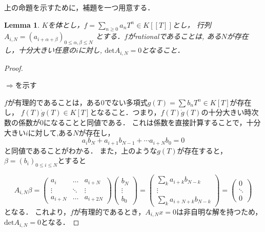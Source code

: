 \documentclass{ujarticle}
\newtheorem{lem}[thm]{Lemma}
\begin{document}
上の命題を示すために，補題を一つ用意する．
\begin{lem}
$K$を体とし，$f　= \sum_{ n \ge 0 }a_nT^n　\in K[[T]]$とし，
行列$A_{i,N}=(a_{i + \alpha + \beta})_{0 \le \alpha,\beta \le N}$
とする．$f$がrationalであることは,
ある$N$が存在し，十分大きい任意の$i$に対し,
$\mathrm{det}A_{i,N}=0$となること．
\end{lem}

\begin{proof}

  \begin{description}
    \item[$\Rightarrow$を示す]
  \end{description}
  $f$が有理的であることは，ある0でない多項式$g(T) = \sum b_n T^n \in K[T]$が存在し，
  $f(T) \dot g(T) \in K[T]$となること．つまり，$f(T) \dot g(T)$の十分大きい時次数の係数が$0$になることと同値である．
  これは係数を直接計算することで，十分大きい$i$に対して,ある$N$が存在し，
  \begin{equation*}
   a_ib_N + a_{i+1}b_{N-1} + \cdots a_{i + N}b_0 = 0
  \end{equation*}
  と同値であることがわかる．
  また，上のような$g(T)$が存在すると，$\beta =(b_i)_{0 \le  i \le N}$とすると

  \begin{equation*}
    A_{i,N} \beta =
    \begin{pmatrix}
      a_{i} &  \dots & a_{i+N} \\
      \vdots &  \ddots & \vdots \\
      a_{i+N} & \dots & a_{i + 2N}
    \end{pmatrix}
    \begin{pmatrix}
    b_N \\
    \vdots \\
     b_0
    \end{pmatrix}
    =
    \begin{pmatrix}
    \sum_k a_{i+k}b_{N-k} \\
     \vdots \\
     \sum_k a_{i+N+k}b_{N-k}
    \end{pmatrix}
    =
    \begin{pmatrix}
      0 \\
     \ddots \\
      0
    \end{pmatrix}
\end{equation*}
となる．
これより，$f$が有理的であるとき，$A_{i,N}x=0$は非自明な解を持つため，
$\mathrm{det}A_{i,N}=0$となる．


\end{proof}
\end{document}
